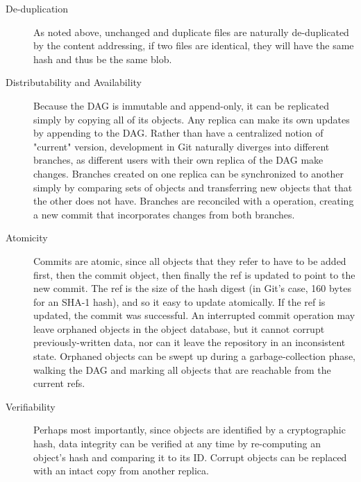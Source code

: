 \begin{description}

    \item[De-duplication] As noted above, unchanged and duplicate files are
        naturally de-duplicated by the content addressing, if two files are
        identical, they will have the same hash and thus be the same blob.

    \item[Distributability and Availability] Because the DAG is immutable and
        append-only, it can be replicated simply by copying all of its objects.
        Any replica can make its own updates by appending to the DAG. Rather
        than have a centralized notion of "current" version, development in Git
        naturally diverges into different branches, as different users with
        their own replica of the DAG make changes. Branches created on one
        replica can be synchronized to another simply by comparing sets of
        objects and transferring new objects that that the other does not have.
        Branches are reconciled with a  operation, creating a new
        commit that incorporates changes from both branches.

    \item[Atomicity] Commits are atomic, since all objects that they refer to
        have to be added first, then the commit object, then finally the ref is updated to point to the new commit. The
        ref is the size of the hash digest (in Git's case, \num{160} bytes for
        an SHA-1 hash), and so it easy to update atomically. If the ref is
        updated, the commit was successful. An interrupted commit operation may
        leave orphaned objects in the object database, but it cannot corrupt
        previously-written data, nor can it leave the repository in an
        inconsistent state. Orphaned objects can be swept up during a
        garbage-collection phase, walking the DAG and marking all objects that
        are reachable from the current refs.

    \item[Verifiability] Perhaps most importantly, since objects are identified
        by a cryptographic hash, data integrity can be verified at any time by
        re-computing an object's hash and comparing it to its ID. Corrupt
        objects can be replaced with an intact copy from another replica.

\end{description}

